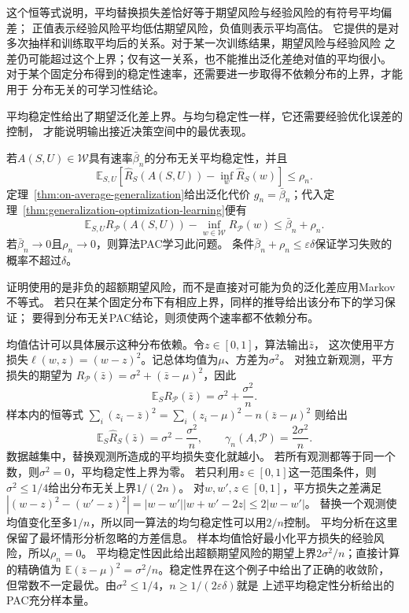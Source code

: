 这个恒等式说明，平均替换损失差恰好等于期望风险与经验风险的有符号平均偏差；
正值表示经验风险平均低估期望风险，负值则表示平均高估。
它提供的是对多次抽样和训练取平均后的关系。对于某一次训练结果，期望风险与经验风险
之差仍可能超过这个上界；仅有这一关系，也不能推出泛化差绝对值的平均很小。
对于某个固定分布得到的稳定性速率，还需要进一步取得不依赖分布的上界，才能用于
分布无关的可学习性结论。

平均稳定性给出了期望泛化差上界。与均匀稳定性一样，它还需要经验优化误差的控制，
才能说明输出接近决策空间中的最优表现。

若$A(S,U)\in\mathcal W$具有速率$\bar\beta_n$的分布无关平均稳定性，并且
\[
 \mathbb E_{S,U}[\hat R_S(A(S,U))-\inf_w\hat R_S(w)]\leq\rho_n.
\]
定理~\ref{thm:on-average-generalization}给出泛化代价
$g_n=\bar\beta_n$；代入定理~\ref{thm:generalization-optimization-learning}便有
\begin{equation}
 \mathbb E_{S,U}R_{\mathcal P}(A(S,U))-
 \inf_{w\in\mathcal W}R_{\mathcal P}(w)\leq\bar\beta_n+\rho_n.
 \label{eq:stability-excess-risk}
\end{equation}
若$\bar\beta_n\to0$且$\rho_n\to0$，则算法PAC学习此问题。
条件$\bar\beta_n+\rho_n\leq\varepsilon\delta$保证学习失败的概率不超过$\delta$。

证明使用的是非负的超额期望风险，而不是直接对可能为负的泛化差应用Markov不等式。
若只在某个固定分布下有相应上界，同样的推导给出该分布下的学习保证；
要得到分布无关PAC结论，则须使两个速率都不依赖分布。

均值估计可以具体展示这种分布依赖。令$z\in[0,1]$，算法输出$\bar z$，
这次使用平方损失$\ell(w,z)=(w-z)^2$。记总体均值为$\mu$、方差为$\sigma^2$。
对独立新观测，平方损失的期望为
$R_{\mathcal P}(\bar z)=\sigma^2+(\bar z-\mu)^2$，因此
\[
 \mathbb E_S R_{\mathcal P}(\bar z)=\sigma^2+\frac{\sigma^2}{n}.
\]
样本内的恒等式
$\sum_i(z_i-\bar z)^2=\sum_i(z_i-\mu)^2-n(\bar z-\mu)^2$
则给出
\[
 \mathbb E_S\hat R_S(\bar z)=\sigma^2-\frac{\sigma^2}{n},
 \qquad \gamma_n(A,\mathcal P)=\frac{2\sigma^2}{n}.
\]
数据越集中，替换观测所造成的平均损失变化就越小。
若所有观测都等于同一个数，则$\sigma^2=0$，平均稳定性上界为零。
若只利用$z\in[0,1]$这一范围条件，则$\sigma^2\leq1/4$给出分布无关上界$1/(2n)$。
对$w,w',z\in[0,1]$，平方损失之差满足
$|(w-z)^2-(w'-z)^2|=|w-w'||w+w'-2z|\leq2|w-w'|$。
替换一个观测使均值变化至多$1/n$，所以同一算法的均匀稳定性可以用$2/n$控制。
平均分析在这里保留了最坏情形分析忽略的方差信息。
样本均值恰好最小化平方损失的经验风险，所以$\rho_n=0$。
平均稳定性因此给出超额期望风险的期望上界$2\sigma^2/n$；直接计算的精确值为
$\mathbb E(\bar z-\mu)^2=\sigma^2/n$。稳定性界在这个例子中给出了正确的收敛阶，
但常数不一定最优。由$\sigma^2\leq1/4$，$n\geq1/(2\varepsilon\delta)$就是
上述平均稳定性分析给出的PAC充分样本量。

